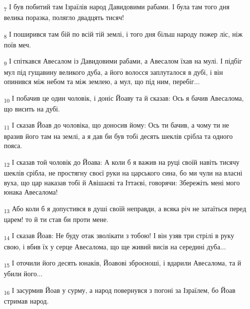\begin{tcolorbox}
\textsubscript{7} І був побитий там Ізраїлів народ Давидовими рабами. І була там того дня велика поразка, полягло двадцять тисяч!
\end{tcolorbox}
\begin{tcolorbox}
\textsubscript{8} І поширився там бій по всій тій землі, і того дня більш народу пожер ліс, ніж поїв меч.
\end{tcolorbox}
\begin{tcolorbox}
\textsubscript{9} І спіткався Авесалом із Давидовими рабами, а Авесалом їхав на мулі. І підбіг мул під гущавину великого дуба, а його волосся заплуталося в дубі, і він опинився між небом та між землею, а мул, що під ним, перебіг...
\end{tcolorbox}
\begin{tcolorbox}
\textsubscript{10} І побачив це один чоловік, і доніс Йоаву та й сказав: Ось я бачив Авесалома, що висить на дубі.
\end{tcolorbox}
\begin{tcolorbox}
\textsubscript{11} І сказав Йоав до чоловіка, що доносив йому: Ось ти бачив, а чому ти не вразив його там на землі, а я дав би був тобі десять шеклів срібла та одного пояса.
\end{tcolorbox}
\begin{tcolorbox}
\textsubscript{12} І сказав той чоловік до Йоава: А коли б я важив на руці своїй навіть тисячу шеклів срібла, не простягну своєї руки на царського сина, бо ми чули на власні вуха, що цар наказав тобі й Авішаєві та Іттаєві, говорячи: Збережіть мені мого юнака Авесалома!
\end{tcolorbox}
\begin{tcolorbox}
\textsubscript{13} Або коли б я допустився в душі своїй неправди, а всяка річ не затаїться перед царем! то й ти став би проти мене.
\end{tcolorbox}
\begin{tcolorbox}
\textsubscript{14} І сказав Йоав: Не буду отак зволікати з тобою! І він узяв три стрілі в руку свою, і вбив їх у серце Авесалома, що ще живий висів на середині дуба...
\end{tcolorbox}
\begin{tcolorbox}
\textsubscript{15} І оточили його десять юнаків, Йоавові зброєноші, і вдарили Авесалома, та й убили його...
\end{tcolorbox}
\begin{tcolorbox}
\textsubscript{16} І засурмив Йоав у сурму, а народ повернувся з погоні за Ізраїлем, бо Йоав стримав народ.
\end{tcolorbox}
